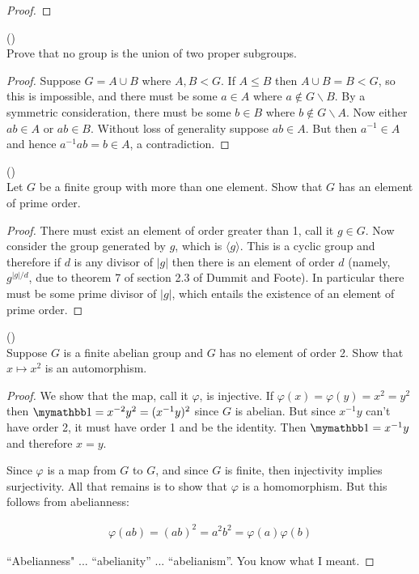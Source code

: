 \documentclass{exam}
\begin{document}
\begin{questions}
\begin{proof}
\end{proof}

\question()\\
Prove that no group is the union of two proper subgroups.

\begin{proof}
  Suppose $G=A\cup B$ where $A,B<G$.  If $A\leq B$ then $A\cup B=B<G$, so this is impossible, and there must be some $a\in A$ where $a\not\in G\smallsetminus B$.  By a symmetric consideration, there must be some $b\in B$ where $b\not\in G\smallsetminus A$.  Now either $ab\in A$ or $ab\in B$.  Without loss of generality suppose $ab\in A$.  But then $a^{-1}\in A$ and hence $a^{-1}ab = b\in A$, a contradiction.  \Lightning
\end{proof}

\question()\\
Let $G$ be a finite group with more than one element.  Show that $G$ has an element of prime order.

\begin{proof}
  There must exist an element of order greater than 1, call it $g\in G$.  Now consider the group generated by $g$, which is $\langle g\rangle$.  This is a cyclic group and therefore if $d$ is any divisor of $|g|$ then there is an element of order $d$ (namely, $g^{|g|/d}$, due to theorem 7 of section 2.3 of Dummit and Foote).  In particular there must be some prime divisor of $|g|$, which entails the existence of an element of prime order.
\end{proof}

\question()\\
Suppose $G$ is a finite abelian group and $G$ has no element of order 2.  Show that $x\mapsto x^2$ is an automorphism.

\begin{proof}
  We show that the map, call it $\varphi$, is injective.  If $\varphi(x)=\varphi(y)=x^2=y^2$ then $\mymathbb 1 = x^{-2}y^2 = (x^{-1}y)^2$ since $G$ is abelian.  But since $x^{-1}y$ can't have order 2, it must have order 1 and be the identity.  Then $\mymathbb 1 = x^{-1}y$  and therefore $x=y$.

  Since $\varphi$ is a map from $G$ to $G$, and since $G$ is finite, then injectivity implies surjectivity.  All that remains is to show that $\varphi$ is a homomorphism.  But this follows from abelianness:

  \begin{align*}
    \varphi(ab)=(ab)^2 = a^2b^2 = \varphi(a)\varphi(b)
  \end{align*}

  ``Abelianness" ... ``abelianity'' ... ``abelianism''.  You know what I meant.
\end{proof}

\end{questions}
\end{document}

